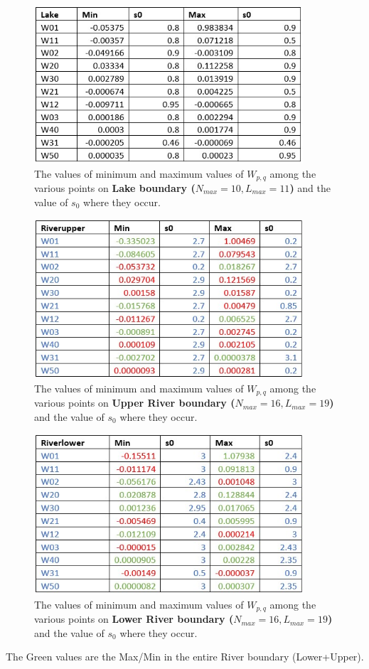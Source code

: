 ﻿\documentclass[12pt,a4paper]{article}
\begin{document}
\begin{figure}[H]
  \centering
  \includegraphics[width=10cm]{TabLake.jpg}
  \caption{The values of minimum and maximum values of $W_{p,q}$ among the various points on \textbf{Lake boundary ($N_{max}=10, L_{max}=11$)} and the value of $s_{0}$ where they occur.}
\end{figure}

\begin{figure}[H]
  \centering
  \includegraphics[width=10cm]{TabUp.jpg}
  \caption{The values of minimum and maximum values of $W_{p,q}$ among the various points on \textbf{Upper River boundary ($N_{max}=16, L_{max}=19$)} and the value of $s_{0}$ where they occur.}
\end{figure}

\begin{figure}[H]
  \centering
  \includegraphics[width=10cm]{TabLow.jpg}
  \caption{The values of minimum and maximum values of $W_{p,q}$ among the various points on \textbf{Lower River boundary ($N_{max}=16, L_{max}=19$)} and the value of $s_{0}$ where they occur.}
\end{figure}
The Green values are the Max/Min in the entire River boundary (Lower+Upper).
\end{document}
